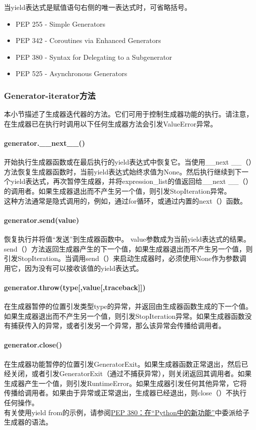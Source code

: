 \documentclass[10pt,UTF8]{ctexart}
\begin{document}
\indent 当yield表达式是赋值语句右侧的唯一表达式时，可省略括号。
\begin{itemize}
\item PEP 255 - Simple Generators
\item PEP 342 - Coroutines via Enhanced Generators
\item PEP 380 - Syntax for Delegating to a Subgenerator
\item PEP 525 - Asynchronous Generators
\end{itemize}
\subsubsection{Generator-iterator方法}
本小节描述了生成器迭代器的方法。它们可用于控制生成器功能的执行。请注意，在生成器已在执行时调用以下任何生成器方法会引发ValueError异常。
\paragraph{generator.__next__()}
开始执行生成器函数或在最后执行的yield表达式中恢复它。当使用__next __（）方法恢复生成器函数时，当前yield表达式始终求值为None。然后执行继续到下一个yield表达式，再次暂停生成器，并将expression_list的值返回给__next __（）的调用者。如果生成器退出而不产生另一个值，则引发StopIteration异常。\\
\indent 这种方法通常是隐式调用的，例如，通过for循环，或通过内置的next（）函数。
\paragraph{generator.send(value)}
恢复执行并将值“发送”到生成器函数中。 value参数成为当前yield表达式的结果。send（）方法返回生成器产生的下一个值，如果生成器退出而不产生另一个值，则引发StopIteration。当调用send（）来启动生成器时，必须使用None作为参数调用它，因为没有可以接收该值的yield表达式。
\paragraph{generator.throw(type[,value[,traceback]])}
在生成器暂停的位置引发类型type的异常，并返回由生成器函数生成的下一个值。如果生成器退出而不产生另一个值，则引发StopIteration异常。如果生成器函数没有捕获传入的异常，或者引发另一个异常，那么该异常会传播给调用者。
\paragraph{generator.close()}
在生成器功能暂停的位置引发GeneratorExit。如果生成器函数正常退出，然后已经关闭，或者引发GeneratorExit（通过不捕获异常），则关闭返回其调用者。如果生成器产生一个值，则引发RuntimeError。如果生成器引发任何其他异常，它将传播给调用者。如果由于异常或正常退出，生成器已经退出，则close（）不执行任何操作。\\
\indent 有关使用yield from的示例，请参阅\href{https://docs.python.org/3/whatsnew/3.3.html#pep-380}{PEP 380：在“Python中的新功能”}中委派给子生成器的语法。
\end{document}
